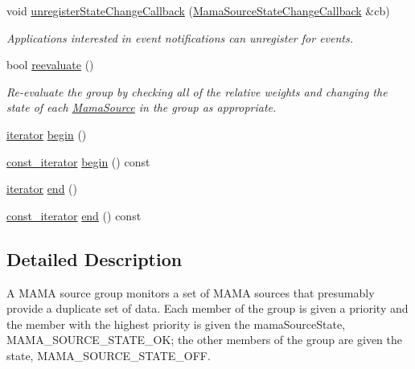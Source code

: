 \begin{DoxyCompactItemize}
void \hyperlink{classWombat_1_1MamaSourceGroup_a0ff2b125e45621698846c15e6c954727}{unregisterStateChangeCallback} (\hyperlink{classWombat_1_1MamaSourceStateChangeCallback}{MamaSourceStateChangeCallback} \&cb)
\begin{DoxyCompactList}\small\item\em Applications interested in event notifications can unregister for events. \item\end{DoxyCompactList}\item 
bool \hyperlink{classWombat_1_1MamaSourceGroup_a4495552ed7ff2748e10749558652792a}{reevaluate} ()
\begin{DoxyCompactList}\small\item\em Re-\/evaluate the group by checking all of the relative weights and changing the state of each \hyperlink{classWombat_1_1MamaSource}{MamaSource} in the group as appropriate. \item\end{DoxyCompactList}\item 
\hyperlink{classWombat_1_1MamaSourceGroup_1_1iterator}{iterator} \hyperlink{classWombat_1_1MamaSourceGroup_a28f48b4318790e7d87ac3bb229eee94b}{begin} ()
\item 
\hyperlink{classWombat_1_1MamaSourceGroup_1_1iterator}{const\_\-iterator} \hyperlink{classWombat_1_1MamaSourceGroup_a5b81ba4ad763351009a7e434e95fb295}{begin} () const 
\item 
\hyperlink{classWombat_1_1MamaSourceGroup_1_1iterator}{iterator} \hyperlink{classWombat_1_1MamaSourceGroup_a29a6d7226dea7635aa9f168a79f7ed9d}{end} ()
\item 
\hyperlink{classWombat_1_1MamaSourceGroup_1_1iterator}{const\_\-iterator} \hyperlink{classWombat_1_1MamaSourceGroup_a5198459780dfbfda88c97a244df89755}{end} () const 
\end{DoxyCompactItemize}


\subsection{Detailed Description}
A MAMA source group monitors a set of MAMA sources that presumably provide a duplicate set of data. Each member of the group is given a priority and the member with the highest priority is given the mamaSourceState, MAMA\_\-SOURCE\_\-STATE\_\-OK; the other members of the group are given the state, MAMA\_\-SOURCE\_\-STATE\_\-OFF. 

